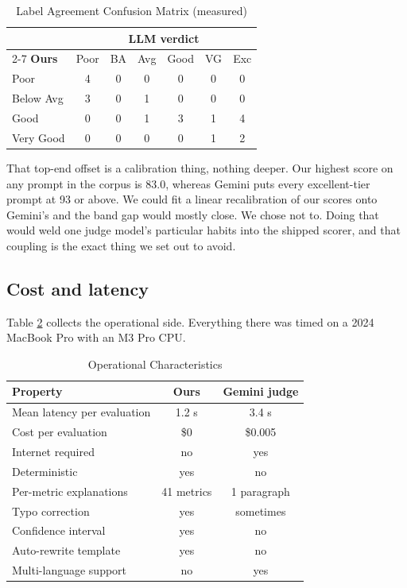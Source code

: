 \documentclass[conference]{IEEEtran}
\begin{document}
\begin{table}[t]
\centering
\caption{Label Agreement Confusion Matrix (measured)}
\label{tab:agreement}
\small
\begin{tabular}{lcccccc}
\toprule
\multicolumn{1}{c}{} & \multicolumn{6}{c}{\textbf{LLM verdict}} \\
\cmidrule(lr){2-7}
\textbf{Ours} & Poor & BA & Avg & Good & VG & Exc \\
\midrule
Poor          & 4 & 0 & 0 & 0 & 0 & 0 \\
Below Avg     & 3 & 0 & 1 & 0 & 0 & 0 \\
Good          & 0 & 0 & 1 & 3 & 1 & 4 \\
Very Good     & 0 & 0 & 0 & 0 & 1 & 2 \\
\bottomrule
\end{tabular}
\end{table}

That top-end offset is a calibration thing, nothing deeper. Our highest score on any prompt in the corpus is 83.0, whereas Gemini puts every excellent-tier prompt at 93 or above. We could fit a linear recalibration of our scores onto Gemini's and the band gap would mostly close. We chose not to. Doing that would weld one judge model's particular habits into the shipped scorer, and that coupling is the exact thing we set out to avoid.

\subsection{Cost and latency}
Table \ref{tab:cost} collects the operational side. Everything there was timed on a 2024 MacBook Pro with an M3 Pro CPU.

\begin{table}[t]
\centering
\caption{Operational Characteristics}
\label{tab:cost}
\begin{tabular}{lcc}
\toprule
\textbf{Property} & \textbf{Ours} & \textbf{Gemini judge} \\
\midrule
Mean latency per evaluation & 1.2 s   & 3.4 s \\
Cost per evaluation         & \$0      & \$0.005 \\
Internet required           & no       & yes \\
Deterministic               & yes      & no \\
Per-metric explanations     & 41 metrics & 1 paragraph \\
Typo correction             & yes      & sometimes \\
Confidence interval         & yes      & no \\
Auto-rewrite template       & yes      & no \\
Multi-language support      & no       & yes \\
\bottomrule
\end{tabular}
\end{table}
\end{document}
